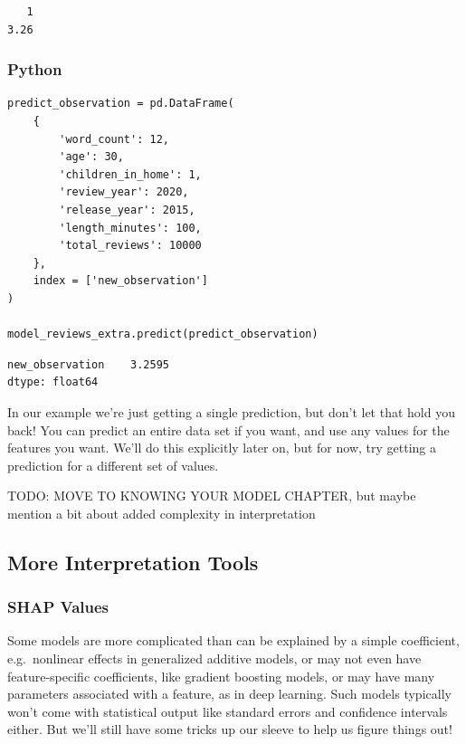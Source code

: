 \documentclass[
  letterpaper,
]{krantz}
\begin{document}
\begin{verbatim}
   1 
3.26 
\end{verbatim}

\subsubsection{Python}

\begin{verbatim}
predict_observation = pd.DataFrame(
    {
        'word_count': 12,
        'age': 30,
        'children_in_home': 1,
        'review_year': 2020,
        'release_year': 2015,
        'length_minutes': 100,
        'total_reviews': 10000
    },
    index = ['new_observation']
)

model_reviews_extra.predict(predict_observation)
\end{verbatim}

\begin{verbatim}
new_observation    3.2595
dtype: float64
\end{verbatim}

In our example we're just getting a single prediction, but don't let
that hold you back! You can predict an entire data set if you want, and
use any values for the features you want. We'll do this explicitly later
on, but for now, try getting a prediction for a different set of values.

TODO: MOVE TO KNOWING YOUR MODEL CHAPTER, but maybe mention a bit about
added complexity in interpretation

\subsection{More Interpretation Tools}\label{sec-lm-more-interpretation}

\subsubsection{SHAP Values}\label{sec-lm-shap-values}

Some models are more complicated than can be explained by a simple
coefficient, e.g.~nonlinear effects in generalized additive models, or
may not even have feature-specific coefficients, like gradient boosting
models, or may have many parameters associated with a feature, as in
deep learning. Such models typically won't come with statistical output
like standard errors and confidence intervals either. But we'll still
have some tricks up our sleeve to help us figure things out!
\end{document}
